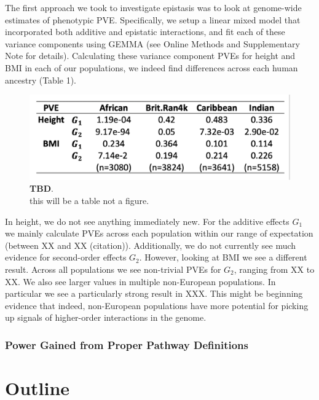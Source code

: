 \documentclass[12pt, a4paper]{article}
\begin{document}
The first approach we took to investigate epistasis was to look at genome-wide estimates of phenotypic PVE. Specifically, we setup a linear mixed model that incorporated both additive and epistatic interactions, and fit each of these variance components using GEMMA \citep{Zhou2012} (see Online Methods and Supplementary Note for details). Calculating these variance component PVEs for height and BMI in each of our populations, we indeed find differences across each human ancestry (Table 1).

\begin{figure}[ht]
\centering
\includegraphics[scale=1]{Images/Table1_Placeholder.png}
\caption[TBD]{\textbf{TBD}. \\ this will be a table not a figure.}
\label{IntrePath-Main-Table-GEMMA}
\end{figure}

In height, we do not see anything immediately new. For the additive effects $G_1$ we mainly calculate PVEs across each population within our range of expectation (between XX and XX (citation)). Additionally, we do not currently see much evidence for second-order effects $G_2$. However, looking at BMI we see a different result. Across all populations we see non-trivial PVEs for $G_2$, ranging from XX to XX. We also see larger values in multiple non-European populations. In particular we see a particularly strong result in XXX. This might be beginning evidence that indeed, non-European populations have more potential for picking up signals of higher-order interactions in the genome.   

\subsubsection{Power Gained from Proper Pathway Definitions}

\section{Outline}
\end{document}
